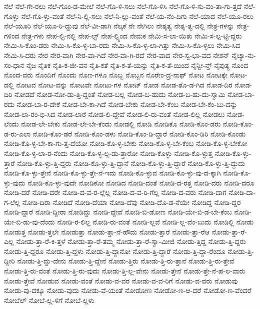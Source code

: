 {ನೆಲೆ
ನೆಲೆ-ಗೇ-ರಲು
ನೆಲೆ-ಗೊಂ-ಡ-ಮೇಲೆ
ನೆಲೆ-ಗೊ-ಳಿ-ಸಲು
ನೆಲೆ-ಗೊ-ಳಿಸಿ
ನೆಲೆ-ಗೊ-ಳಿ-ಸು-ವಂ-ತಾ-ಗು-ತ್ತದೆ
ನೆಲೆ-ಗೊಳ್ಳು
ನೆಲೆ-ಗೊ-ಳ್ಳು-ವಂತೆ
ನೆಲೆ-ನಿ-ಲ್ಲಿ-ಸಲು
ನೆಲೆ-ನಿ-ಲ್ಲು-ವಂತೆ
ನೆಲೆ-ಯ-ನೆಂ-ದಿಗು
ನೆಲೆ-ಯಾದ
ನೆಲೆ-ಯೂ-ರಲು
ನೆಲೆ-ಯೂರಿ
ನೆಲೆ-ಯೂ-ರಿ-ದ್ದುವು
ನೆಲೆ-ವೀ-ಡಾಗಿ
ನೆಲ್ಕಕೆ
ನೇ
ನೇಗಿಲು
ನೇತೃತ್ವ
ನೇತೃ-ತ್ವ-ದಲ್ಲಿ
ನೇತ್ರ-ಗಳನ್ನು
ನೇತ್ರ-ಗಳಿಂದ
ನೇತ್ರ-ಗಳು
ನೇಪ-ಲ್ಸಿ-ನಲ್ಲಿ
ನೇಪ-ಲ್ಸ್
ನೇಪ-ಲ್ಸ್ನಿಂದ
ನೇಮಕ
ನೇಮಿ-ಸ-ಲಾ-ಯಿತು
ನೇಮಿ-ಸ-ಲ್ಪ-ಟ್ಟಿ-ದ್ದರು
ನೇಮಿ-ಸಿ-ಕೊಂ-ಡರು
ನೇಮಿ-ಸಿ-ಕೊ-ಳ್ಳ-ಬಾ-ರದು
ನೇಮಿ-ಸಿ-ಕೊ-ಳ್ಳ-ಲಾ-ಗಿತ್ತು
ನೇಮಿ-ಸಿ-ಕೊ-ಳ್ಳಲು
ನೇಮಿ-ಸಿದ
ನೇಮಿ-ಸಿ-ದರು
ನೇರ
ನೇರ-ವಾಗಿ
ನೇರ-ವಾ-ಗಿದೆ
ನೇರ-ವಾ-ಗಿ-ರದೆ
ನೇರ-ವಾದ
ನೇರ-ಸ್ವ-ಭಾ-ವದ
ನೇಶನ್
ನೈಚ್ಯಾ-ನು-ಸಂ-ಧಾನ
ನೈಜ
ನೈತಿಕ
ನೈತಿ-ಕ-ಜೀ-ವನ
ನೈತಿ-ಕತೆ
ನೈತಿ-ಕ-ತೆ-ಯನ್ನು
ನೈತಿ-ಕ-ತೆ-ಯಿಂದ
ನೈನ್ಟೀ-ನ್ತ್
ನೈಪುತ್ಯ
ನೊಂದ
ನೊಂದ-ವರು
ನೊಂದಿಗೆ
ನೊಂದು
ನೊಣ-ಗಳೂ
ನೊಬ್ಬ
ನೊಬ್ಬನ
ನೊರೇಂ-ದ್ರ-ನಾಥ್
ನೋಟ
ನೋಟಕ್ಕೇ
ನೋಟ-ದಲ್ಲಿ
ನೋಟವ
ನೋಟ-ವನ್ನು
ನೋಟವೇ
ನೋಟು-ಗಳ
ನೋಟ್
ನೋಡ
ನೋಡ-ತೊ-ಡ-ಗಿದ
ನೋಡ-ದಿರ
ನೋಡ-ದಿರಿ
ನೋಡದೆ
ನೋಡ-ನೋ-ಡು-ತ್ತಿ-ದ್ದಂತೆ
ನೋಡ-ಬಲ್ಲ
ನೋಡ-ಬ-ಹುದು
ನೋಡ-ಬ-ಹು-ದು-ಸ್ವಾಮಿ
ನೋಡ-ಬಾ-ರದು
ನೋಡ-ಬಾ-ರ-ದೇಕೆ
ನೋಡ-ಬೇ-ಕಾ-ಗಿದೆ
ನೋಡ-ಬೇಕು
ನೋಡ-ಬೇ-ಕೆಂಬ
ನೋಡ-ಬೇ-ಕೆಂ-ಬು-ದನ್ನು
ನೋಡ-ಲಾ-ರಂ-ಭಿ-ಸಿದ
ನೋಡ-ಲಾರೆ
ನೋಡ-ಲಿ-ದ್ದೇವೆ
ನೋಡ-ಲಿ-ರು-ವಂತೆ
ನೋಡ-ಲಿಲ್ಲ
ನೋಡಲು
ನೋಡ-ಲೆಂದು
ನೋಡ-ಲೇ-ಬೇಕು
ನೋಡ-ಲೇ-ಬೇ-ಕೆಂದು
ನೋಡಲ್ಲಿ
ನೋಡಿ
ನೋಡಿಕೊ
ನೋಡಿ-ಕೊಂ-ಡರು
ನೋಡಿ-ಕೊಂ-ಡ-ರು-ಎಲಾ
ನೋಡಿ-ಕೊಂ-ಡರೆ
ನೋಡಿ-ಕೊಂ-ಡಳು
ನೋಡಿ-ಕೊಂ-ಡಿ-ದ್ದಾರೆ
ನೋಡಿ-ಕೊಂ-ಡಿರಿ
ನೋಡಿ-ಕೊಂಡು
ನೋಡಿ-ಕೊ-ಳ್ಳ-ಬೇ-ಕಾ-ಗು-ತ್ತ-ದೆಯೋ
ನೋಡಿ-ಕೊ-ಳ್ಳ-ಬೇಕು
ನೋಡಿ-ಕೊ-ಳ್ಳ-ಬೇ-ಕೆಂಬ
ನೋಡಿ-ಕೊ-ಳ್ಳ-ಬೇಕೋ
ನೋಡಿ-ಕೊ-ಳ್ಳ-ಲಾ-ರ-ನೆಂದು
ನೋಡಿ-ಕೊ-ಳ್ಳ-ಲ್ಪ-ಡು-ತ್ತಾರೋ
ನೋಡಿ-ಕೊಳ್ಳು
ನೋಡಿ-ಕೊ-ಳ್ಳುತ್ತ
ನೋಡಿ-ಕೊ-ಳ್ಳು-ತ್ತಾರೆ
ನೋಡಿ-ಕೊ-ಳ್ಳು-ತ್ತಿ-ದ್ದರು
ನೋಡಿ-ಕೊ-ಳ್ಳು-ತ್ತಿ-ದ್ದಾನೆ
ನೋಡಿ-ಕೊ-ಳ್ಳು-ತ್ತಿ-ದ್ದಾರೆ
ನೋಡಿ-ಕೊ-ಳ್ಳು-ತ್ತಿ-ದ್ದುದು
ನೋಡಿ-ಕೊ-ಳ್ಳು-ತ್ತೇನೆ
ನೋಡಿ-ಕೊ-ಳ್ಳು-ತ್ತೇ-ನೆ-ಇದು
ನೋಡಿ-ಕೊ-ಳ್ಳುವ
ನೋಡಿ-ಕೊ-ಳ್ಳು-ವು-ದ-ಕ್ಕಾಗಿ
ನೋಡಿ-ಕೊ-ಳ್ಳು-ವುದು
ನೋಡಿ-ಕೊ-ಳ್ಳು-ವುದೇ
ನೋಡಿಕೋ
ನೋಡಿದ
ನೋಡಿ-ದಂತೆ
ನೋಡಿ-ದ-ರತ್ತ
ನೋಡಿ-ದರು
ನೋಡಿ-ದರೂ
ನೋಡಿ-ದರೆ
ನೋಡಿ-ದರೇ
ನೋಡಿ-ದ-ವ-ರ-ಲ್ಲೆಲ್ಲ
ನೋಡಿ-ದ-ವ-ರಿ-ಗೆಲ್ಲ
ನೋಡಿ-ದ-ವರು
ನೋಡಿ-ದಾಗ
ನೋಡಿ-ದಾ-ಗ-ಲೆಲ್ಲ
ನೋಡಿ-ದಿರಾ
ನೋಡಿದೆ
ನೋಡಿ-ದೆಯಾ
ನೋಡಿ-ದೆವು
ನೋಡಿ-ದೊ-ಡ-ನೆಯೇ
ನೋಡಿದ್ದ
ನೋಡಿ-ದ್ದರ
ನೋಡಿ-ದ್ದಾರೆ
ನೋಡಿ-ದ್ದೀರಾ
ನೋಡಿದ್ದು
ನೋಡಿ-ದ್ದೇವೆ
ನೋಡಿ-ಬಿ-ಡೋಣ
ನೋಡಿ-ಯೇ-ಬಿ-ಡ-ಬೇ-ಕೆಂಬ
ನೋಡಿ-ಯೇ-ಬಿ-ಡು-ವು-ದೆಂದು
ನೋಡಿ-ರ-ಲಿಲ್ಲ
ನೋಡಿ-ರು-ವಂತೆ
ನೋಡಿ-ಲ್ಲವೆ
ನೋಡಿ-ಲ್ಲ-ವೆಂ-ಬುದು
ನೋಡಿಲ್ಲಿ
ನೋಡು
ನೋಡುತ್ತ
ನೋಡು-ತ್ತಲೇ
ನೋಡುತ್ತಾ
ನೋಡು-ತ್ತಾ-ನೆ-ಹೌದು
ನೋಡು-ತ್ತಾರೆ
ನೋಡು-ತ್ತಾ-ರೆಆ
ನೋಡು-ತ್ತಾ-ರೆ-ಎಲ್ಲ
ನೋಡು-ತ್ತಾ-ರೆ-ಕಿ-ತ್ತಳೆ
ನೋಡು-ತ್ತಾ-ರೆ-ತಮ್ಮ
ನೋಡು-ತ್ತಾ-ರೆ-ಸ್ವಾ-ಮೀಜಿ
ನೋಡು-ತ್ತಿದ್ದ
ನೋಡು-ತ್ತಿ-ದ್ದರು
ನೋಡು-ತ್ತಿ-ದ್ದರೂ
ನೋಡು-ತ್ತಿ-ದ್ದಳು
ನೋಡು-ತ್ತಿ-ದ್ದಾನೋ
ನೋಡು-ತ್ತಿ-ದ್ದಾರೆ
ನೋಡು-ತ್ತಿ-ದ್ದಾ-ರೆಂದೂ
ನೋಡು-ತ್ತಿ-ದ್ದೀರಿ
ನೋಡು-ತ್ತಿ-ದ್ದು-ದೇನು
ನೋಡು-ತ್ತಿ-ದ್ದೇನೆ
ನೋಡು-ತ್ತಿರು
ನೋಡು-ತ್ತಿ-ರು-ತ್ತಾನೆ
ನೋಡು-ತ್ತಿ-ರು-ತ್ತೇವೆ
ನೋಡು-ತ್ತಿ-ರು-ವಂತೆ
ನೋಡು-ತ್ತಿ-ರು-ವುದು
ನೋಡು-ತ್ತಿ-ಲ್ಲ-ವೇನು
ನೋಡು-ತ್ತೇನೆ
ನೋಡು-ತ್ತೇ-ನೆ-ಹ-ಲ-ವಾರು
ನೋಡು-ತ್ತೇವೆ
ನೋಡುವ
ನೋಡು-ವಂತೆ
ನೋಡು-ವ-ವರ
ನೋಡು-ವ-ವ-ರಿಗೆ
ನೋಡು-ವ-ವರು
ನೋಡುವು
ನೋಡು-ವು-ದಕ್ಕೂ
ನೋಡು-ವುದು
ನೋಡು-ವೆ-ಯಂತೆ
ನೋಡೋಣ
ನೋಡೋ-ಣ-ಆ-ದರೆ
ನೋಡೋ-ಣ-ವೆಂದರೆ
ನೋಬೆಲ್
ನೋಬೆ-ಲ್ಲ-ಳಿಗೆ
ನೋಬೆ-ಲ್ಲಳು
}
